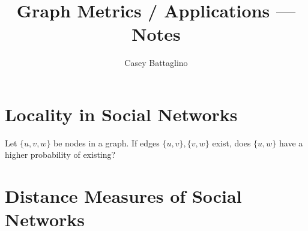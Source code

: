 \documentclass[11pt]{article}
\title{Graph Metrics / Applications --- Notes}
\author{Casey Battaglino}
\begin{document}
\maketitle


\section{Locality in Social Networks}

Let $\{u,v,w\}$ be nodes in a graph. If edges $\{u,v\}, \{v,w\}$ exist, does $\{u,w\}$ have a higher probability of existing?

\section{Distance Measures of Social Networks}





\end{document}
